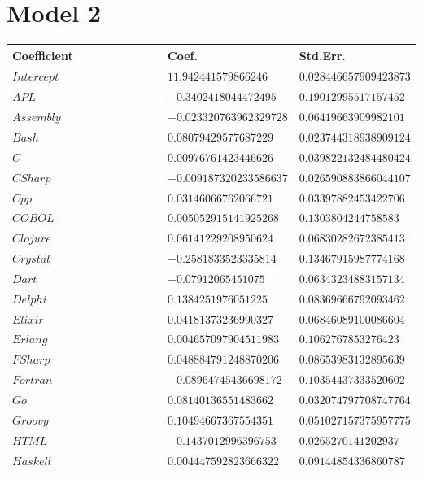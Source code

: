\documentclass{report}
\begin{document}
\section{Model 2}
\label{data:model2}

\begin{longtable}{|R{0.4\linewidth}|R{0.3\linewidth}|R{0.3\linewidth}|}
  \hline
  \textbf{Coefficient} & \textbf{Coef.} & \textbf{Std.Err.} \\

  \hline
  $Intercept$ & $11.942441579866246$ & $0.028446657909423873$\\
  \hline
  $APL$ & $-0.3402418044472495$ & $0.19012995517157452$\\
  \hline
  $Assembly$ & $-0.023320763962329728$ & $0.06419663909982101$\\
  \hline
  $Bash$ & $0.08079429577687229$ & $0.023744318938909124$\\
  \hline
  $C$ & $0.00976761423446626$ & $0.039822132484480424$\\
  \hline
  $CSharp$ & $-0.009187320233586637$ & $0.026590883866044107$\\
  \hline
  $Cpp$ & $0.03146066762066721$ & $0.03397882453422706$\\
  \hline
  $COBOL$ & $0.005052915141925268$ & $0.1303804244758583$\\
  \hline
  $Clojure$ & $0.06141229208950624$ & $0.06830282672385413$\\
  \hline
  $Crystal$ & $-0.2581833523335814$ & $0.13467915987774168$\\
  \hline
  $Dart$ & $-0.07912065451075$ & $0.06343234883157134$\\
  \hline
  $Delphi$ & $0.1384251976051225$ & $0.08369666792093462$\\
  \hline
  $Elixir$ & $0.04181373236990327$ & $0.06846089100086604$\\
  \hline
  $Erlang$ & $0.004657097904511983$ & $0.1062767853276423$\\
  \hline
  $FSharp$ & $0.048884791248870206$ & $0.08653983132895639$\\
  \hline
  $Fortran$ & $-0.08964745436698172$ & $0.10354437333520602$\\
  \hline
  $Go$ & $0.08140136551483662$ & $0.032074797708747764$\\
  \hline
  $Groovy$ & $0.10494667367554351$ & $0.051027157375957775$\\
  \hline
  $HTML$ & $-0.1437012996396753$ & $0.0265270141202937$\\
  \hline
  $Haskell$ & $0.004447592823666322$ & $0.09144854336860787$\\

\end{longtable}
\end{document}
